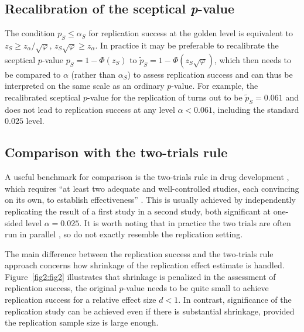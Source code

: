 \subsection{Recalibration of the sceptical \textit{p}-value}\label{sec2:recalib}

The condition $p_S \leq \alpha_S$ for replication success at the golden level is
equivalent to $z_S \geq z_\alpha / \sqrt{\varphi}$, \ie
$z_S \sqrt{\varphi} \geq z_\alpha$. In practice it may be preferable to
recalibrate the sceptical $p$-value $p_{S} = 1 - \Phi(z_S)$ to
$ \tilde{p}_S = 1 - \Phi(z_S \sqrt{\varphi})$, which then needs to be compared
to $\alpha$ (rather than $\alpha_S$) to assess replication success and can thus
be interpreted on the same scale as an ordinary $p$-value. For example, the
recalibrated sceptical $p$-value for the replication of \citet{Pyc2010} turns
out to be $\tilde{p}_S=0.061$ and does not lead to replication success at any
level $\alpha<0.061$, including the standard $0.025$ level.


\subsection{Comparison with the two-trials rule}\label{sec2:2TR}
A useful benchmark for comparison is the two-trials rule in drug development
\citep[Section 9.4]{Kay2015}, which requires ``at least two adequate and
well-controlled studies, each convincing on its own, to establish
effectiveness'' \citep[p.~3]{FDA1998}. This is usually achieved by independently
replicating the result of a first study in a second study, both significant at
one-sided level $\alpha=0.025$. {It is worth noting that in practice the two
  trials are often run in parallel} {\citep{Senn2008}}{, so do not exactly
  resemble the replication setting.}



The main difference between the replication success and the two-trials
rule approach concerns how shrinkage of the replication effect
estimate is handled. Figure~\ref{fig2:fig2} illustrates that
shrinkage is penalized in the assessment of replication success, \ie
the original $p$-value needs to be quite small to achieve replication
success for a relative effect size $d<1$. In contrast, significance of
the replication study can be achieved even if there is substantial
shrinkage, provided the replication sample size is large enough.



